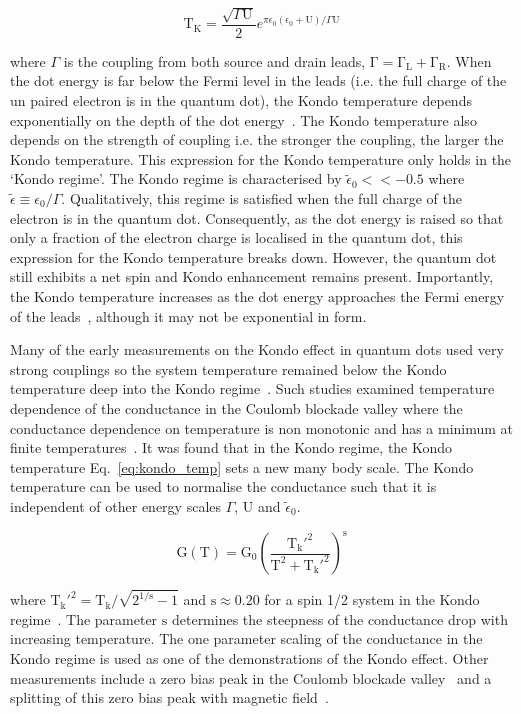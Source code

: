 \begin{equation}\label{eq:kondo_temp}
 \mathrm{T_K} = 
 \frac{\sqrt{\Gamma \mathrm{U}}}{2}
 e^{\pi \epsilon_0 (\epsilon_0 + \mathrm{U})/\Gamma\mathrm{U}}
\end{equation}

where $\Gamma$ is the coupling from both source and drain leads, $\mathrm{\Gamma = \Gamma_L + \Gamma_R}$. When the dot energy is far below the Fermi level in the leads (i.e. the full charge of the un paired electron is in the quantum dot), the Kondo temperature depends exponentially on the depth of the dot energy~\cite{goldhaber_mv}. The Kondo temperature also depends on the strength of coupling i.e. the stronger the coupling, the larger the Kondo temperature. This expression for the Kondo temperature only holds in the `Kondo regime'. The Kondo regime is characterised by $\tilde{\epsilon}_0<<-0.5$ where $\tilde{\epsilon}\equiv \epsilon_0/\Gamma$. Qualitatively, this regime is satisfied when the full charge of the electron is in the quantum dot. Consequently, as the dot energy is raised so that only a fraction of the electron charge is localised in the quantum dot, this expression for the Kondo temperature breaks down. However, the quantum dot still exhibits a net spin and Kondo enhancement remains present. Importantly, the Kondo temperature increases as the dot energy approaches the Fermi energy of the leads~\cite{goldhaber_mv}, although it may not be exponential in form. 

Many of the early measurements on the Kondo effect in quantum dots used very strong couplings so the system temperature remained below the Kondo temperature deep into the Kondo regime~\cite{kondo_unitary}. Such studies examined temperature dependence of the conductance in the Coulomb blockade valley where the conductance dependence on temperature is non monotonic and has a minimum at finite temperatures~\cite{Pustilnik2004}. It was found that in the Kondo regime, the Kondo temperature Eq.~\ref{eq:kondo_temp} sets a new many body scale. The Kondo temperature can be used to normalise the conductance such that it is independent of other energy scales $\Gamma$, $\mathrm{U}$ and $\tilde{\epsilon}_0$.

\begin{equation}\label{eq:kondo_conductance}
 \mathrm{G(T)} =
 \mathrm{G_0}
 \left(
 \frac{\mathrm{T_k'^{2}}}{\mathrm{T^2} + \mathrm{T_k'^{2}}}
 \right)^\mathrm{s}
\end{equation}

where $\mathrm{T_k'^{2}} = \mathrm{T_k}/\sqrt{2^{\mathrm{1/s}}-1}$ and $\mathrm{s} \approx 0.20$ for a spin 1/2 system in the Kondo regime~\cite{goldhaber_mv}. The parameter $\mathrm{s}$ determines the steepness of the conductance drop with increasing temperature. The one parameter scaling of the conductance in the Kondo regime is used as one of the demonstrations of the Kondo effect. Other measurements include a zero bias peak in the Coulomb blockade valley~\cite{kondo_unitary} and a splitting of this zero bias peak with magnetic field~\cite{cronenwett_tunable_kondo}. 

